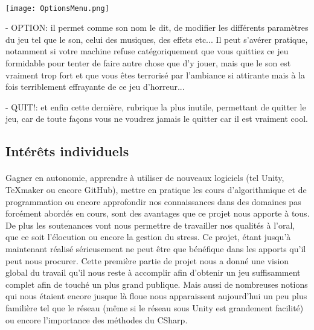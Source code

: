 \documentclass[12pt,a4paper]{article}
\begin{document}
\paragraph{}
\begin{center}
\texttt{[image: OptionsMenu.png]}
\end{center}

\item[-] OPTION: il permet comme son nom le dit, de modifier les différents paramètres du jeu tel que le son, celui des musiques, des effets etc... Il peut s'avérer pratique, notamment si votre machine refuse catégoriquement que vous quittiez ce jeu formidable pour tenter de faire autre chose que d'y jouer, mais que le son est vraiment trop fort et que vous êtes terrorisé par l'ambiance si attirante mais à la fois terriblement effrayante de ce jeu d'horreur...

\item[-] QUIT!: et enfin cette dernière, rubrique la plus inutile, permettant de quitter le jeu, car de toute façons vous ne voudrez jamais le quitter car il est vraiment cool.

\newpage

\subsection{Intérêts individuels}
\paragraph{}
Gagner en autonomie, apprendre à utiliser de nouveaux logiciels (tel Unity, TeXmaker ou encore GitHub), mettre en pratique les cours d'algorithmique et de programmation ou encore approfondir nos connaissances dans des domaines pas forcément abordés en cours, sont des avantages que ce projet nous apporte à tous.
De plus les soutenances vont nous permettre de travailler nos qualités à l'oral, que ce soit l'élocution ou encore la gestion du stress. Ce projet, étant jusqu'à maintenant réalisé sérieusement ne peut être que bénéfique dans les apports qu'il peut nous procurer.
Cette première partie de projet nous a donné une vision global du travail qu'il nous reste à accomplir afin d'obtenir un jeu suffisamment complet afin de touché un plus grand publique. Mais aussi de nombreuses notions qui nous étaient encore jusque là floue nous apparaissent aujourd'hui un peu plus familière tel que le réseau (même si le réseau sous Unity est grandement facilité) ou encore l'importance des méthodes du CSharp.
\end{document}
